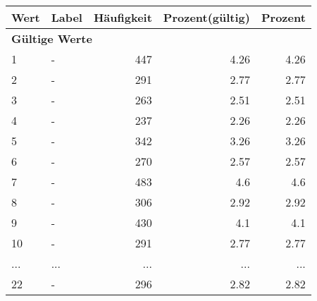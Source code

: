      \begin{longtable}{lXrrr}
     \toprule
     \textbf{Wert} & \textbf{Label} & \textbf{Häufigkeit} & \textbf{Prozent(gültig)} & \textbf{Prozent} \\
     \endhead
     \midrule
     \multicolumn{5}{l}{\textbf{Gültige Werte}}\\
        1 & \multicolumn{1}{X}{-} & %
          \num{447} &
          \num[round-mode=places,round-precision=2]{4,26} &
          \num[round-mode=places,round-precision=2]{4,26} \\
        2 & \multicolumn{1}{X}{-} & %
          \num{291} &
          \num[round-mode=places,round-precision=2]{2,77} &
          \num[round-mode=places,round-precision=2]{2,77} \\
        3 & \multicolumn{1}{X}{-} & %
          \num{263} &
          \num[round-mode=places,round-precision=2]{2,51} &
          \num[round-mode=places,round-precision=2]{2,51} \\
        4 & \multicolumn{1}{X}{-} & %
          \num{237} &
          \num[round-mode=places,round-precision=2]{2,26} &
          \num[round-mode=places,round-precision=2]{2,26} \\
        5 & \multicolumn{1}{X}{-} & %
          \num{342} &
          \num[round-mode=places,round-precision=2]{3,26} &
          \num[round-mode=places,round-precision=2]{3,26} \\
        6 & \multicolumn{1}{X}{-} & %
          \num{270} &
          \num[round-mode=places,round-precision=2]{2,57} &
          \num[round-mode=places,round-precision=2]{2,57} \\
        7 & \multicolumn{1}{X}{-} & %
          \num{483} &
          \num[round-mode=places,round-precision=2]{4,6} &
          \num[round-mode=places,round-precision=2]{4,6} \\
        8 & \multicolumn{1}{X}{-} & %
          \num{306} &
          \num[round-mode=places,round-precision=2]{2,92} &
          \num[round-mode=places,round-precision=2]{2,92} \\
        9 & \multicolumn{1}{X}{-} & %
          \num{430} &
          \num[round-mode=places,round-precision=2]{4,1} &
          \num[round-mode=places,round-precision=2]{4,1} \\
        10 & \multicolumn{1}{X}{-} & %
          \num{291} &
          \num[round-mode=places,round-precision=2]{2,77} &
          \num[round-mode=places,round-precision=2]{2,77} \\
       ... & ... & ... & ... & ... \\
        22 & \multicolumn{1}{X}{-} & %
          \num{296} &
          \num[round-mode=places,round-precision=2]{2,82} &
          \num[round-mode=places,round-precision=2]{2,82} \\


\end{longtable}
